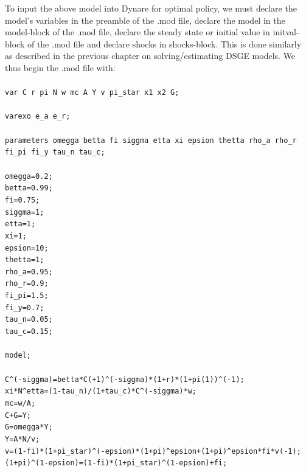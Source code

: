 \documentclass[10pt,math=newtx,citestyle=gb7714-2015,bibstyle=gb7714-2015]{elegantbook}
\begin{document}
{	To input the above model into Dynare for optimal policy, we must declare the model’s variables in the preamble of the .mod file, declare the model in the model-block of the .mod file, declare the steady state or initial value in initval-block of the .mod file and declare shocks in shocks-block. This is done similarly as described in the previous chapter on solving/estimating DSGE models. We thus begin the .mod file with:\\
	\\
	\texttt{var C r pi N w mc A Y v pi\_star x1 x2 G;\\
		\\
		varexo e\_a e\_r;\\
		\\
		parameters omegga betta fi siggma etta xi epsion thetta rho\_a rho\_r fi\_pi fi\_y tau\_n tau\_c;\\
		\\
		omegga=0.2;\\
		betta=0.99;\\
		fi=0.75;\\
		siggma=1;\\
		etta=1;\\
		xi=1;\\
		epsion=10;\\
		thetta=1;\\
		rho\_a=0.95;\\
		rho\_r=0.9;\\
		fi\_pi=1.5;\\
		fi\_y=0.7;\\
		tau\_n=0.05;\\
		tau\_c=0.15;\\
		\\
		model;\\
		\\
		C\textasciicircum (-siggma)=betta*C(+1)\textasciicircum(-siggma)*(1+r)*(1+pi(1))\textasciicircum(-1);\\
		xi*N\textasciicircum etta=(1-tau\_n)/(1+tau\_c)*C\textasciicircum (-siggma)*w;\\
		mc=w/A;\\
		C+G=Y;\\
		G=omegga*Y;\\
		Y=A*N/v;\\
		v=(1-fi)*(1+pi\_star)\textasciicircum (-epsion)*(1+pi)\textasciicircum epsion+(1+pi)\textasciicircum epsion*fi*v(-1);\\
		(1+pi)\textasciicircum (1-epsion)=(1-fi)*(1+pi\_star)\textasciicircum (1-epsion)+fi;\\
}}
\end{document}
